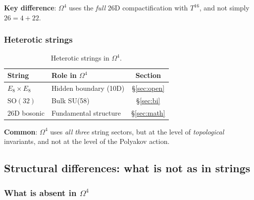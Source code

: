 \documentclass[11pt,a4paper]{article}
\newcommand{\SO}{\ensuremath{\mathrm{SO}}}
\newcommand{\Om}{\ensuremath{\Omega^4}}
\theoremstyle{definition}
\begin{document}
\medskip\noindent
\textbf{Key difference}: $\Om$ uses the \emph{full}
26D compactification with $T^{16}$, and not simply $26 = 4 + 22$.

\subsubsection{Heterotic strings}

\begin{table}[ht]
\centering
\caption{Heterotic strings in \texorpdfstring{$\Om$}{}.}
\label{tab:string-heterotic}
\begin{tabular}{llc}
\toprule
String & Role in $\Om$ & Section \\
\midrule
$E_8 \times E_8$ & Hidden boundary (10D) & \S\ref{sec:open} \\
$\SO(32)$ & Bulk SU(58) & \S\ref{sec:bi} \\
$26$D bosonic & Fundamental structure & \S\ref{sec:math} \\
\bottomrule
\end{tabular}
\end{table}

\medskip\noindent
\textbf{Common}: $\Om$ uses \emph{all three} string
sectors, but at the level of \emph{topological} invariants,
and not at the level of the Polyakov action.

\subsection{Structural differences: what is not as in strings}
\label{subsec:string-differences}

\subsubsection{What is absent in \texorpdfstring{$\Om$}{}}
\end{document}
